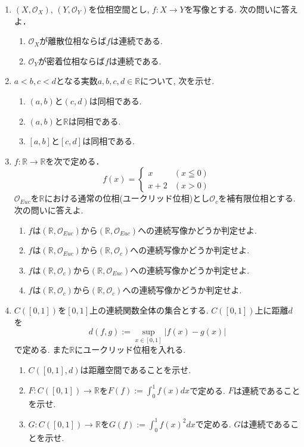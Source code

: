 \documentclass[dvipdfmx,a4paper,11pt]{article}
\newcommand{\R}{\mathbb{R}}
\theoremstyle{definition}
\begin{document}
\begin{enumerate}[ label=\textbf{問}3.\arabic*]

\item $(X, \mathscr{O}_X )$, $(Y, \mathscr{O}_Y)$を位相空間とし, $f : X \rightarrow Y$を写像とする. 次の問いに答えよ．
	\begin{enumerate}
	\item $\mathscr{O}_X $が離散位相ならば$f$は連続である.
	\item $\mathscr{O}_Y $が密着位相ならば$f$は連続である.
	\end{enumerate}

\item $a<b, c<d$となる実数$a,b,c,d \in \R$について, 次を示せ.
 	\begin{enumerate}
	\item $(a,b)$と$(c,d)$は同相である.  
	\item $(a,b)$と$\R$は同相である. 
	\item $[a,b]$と$[c,d]$は同相である. 
	\end{enumerate}	
	
\item $f : \R \rightarrow \R$を次で定める．
   $$
  f(x)= \begin{cases}
     x& (x \leqq 0) \\
    x+2& (x >0)
  \end{cases}
  $$
  $\mathscr{O}_{Euc}$を$\R$における通常の位相(ユークリッド位相)とし$\mathscr{O}_c$を補有限位相とする. 次の問いに答えよ.
 	\begin{enumerate}
	\item $f $は$(\R, \mathscr{O}_{Euc})$から$(\R, \mathscr{O}_{Euc})$への連続写像かどうか判定せよ.
	\item $f $は$(\R, \mathscr{O}_{Euc})$から$(\R, \mathscr{O}_c)$への連続写像かどうか判定せよ.
	\item $f $は$(\R, \mathscr{O}_c)$から$(\R, \mathscr{O}_{Euc})$への連続写像かどうか判定せよ.
	\item $f $は$(\R, \mathscr{O}_c)$から$(\R, \mathscr{O}_c)$への連続写像かどうか判定せよ.
	\end{enumerate}

\item $C([0,1])$を$[0,1]$上の連続関数全体の集合とする. $C([0,1])$上に距離$d$を
$$
d(f,g) := \sup_{x \in [0,1]} | f(x) - g(x)|
$$
で定める. また$\R$にユークリッド位相を入れる.
	\begin{enumerate}
	\item $C([0,1], d)$は距離空間であることを示せ.
	\item $F : C([0,1]) \rightarrow \R$を$F(f) := \int_{0}^{1} f(x) dx$で定める. $F$は連続であることを示せ.
	\item $G : C([0,1]) \rightarrow \R$を$G(f) := \int_{0}^{1} f(x)^2 dx$で定める. $G$は連続であることを示せ.
	\end{enumerate}


\end{enumerate}
\end{document}
